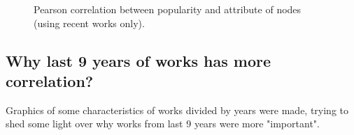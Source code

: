 \begin{figure}[!h]
	\begin{flushleft}
	\caption{Pearson correlation between popularity and attribute of nodes (using recent works only).}
	\label{fig:pearsonCorrRecentWorks}
	\end{flushleft}
\end{figure}

\FloatBarrier
\subsection{Why last 9 years of works has more correlation?}
Graphics of some characteristics of works divided by years were made, trying to shed some light over why works from last 9 years were more "important".

